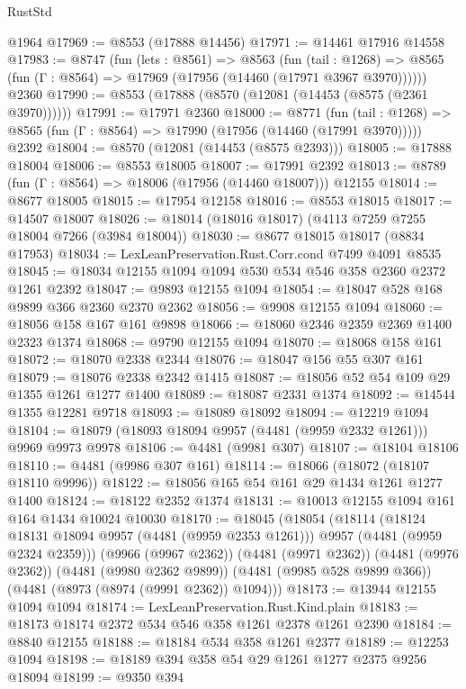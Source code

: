 \begin{lexlean}{RustStd}
\begin{coremodule}
    @1964
@17969 := @8553 (@17888 @14456)
@17971 := @14461 @17916 @14558
@17983 := @8747
    (fun (lets : @8561) =>
    @8563
      (fun (tail : @1268) =>
      @8565 (fun (Γ : @8564) => @17969 (@17956 (@14460 (@17971 @3967 @3970))))))
    @2360
@17990 := @8553 (@17888 (@8570 (@12081 (@14453 (@8575 (@2361 @3970))))))
@17991 := @17971 @2360
@18000 := @8771
    (fun (tail : @1268) => @8565 (fun (Γ : @8564) => @17990 (@17956 (@14460 (@17991 @3970)))))
    @2392
@18004 := @8570 (@12081 (@14453 (@8575 @2393)))
@18005 := @17888 @18004
@18006 := @8553 @18005
@18007 := @17991 @2392
@18013 := @8789 (fun (Γ : @8564) => @18006 (@17956 (@14460 @18007))) @12155
@18014 := @8677 @18005
@18015 := @17954 @12158
@18016 := @8553 @18015
@18017 := @14507 @18007
@18026 := @18014 (@18016 @18017) (@4113 @7259 @7255 @18004 @7266 (@3984 @18004))
@18030 := @8677 @18015 @18017 (@8834 @17953)
@18034 := LexLeanPreservation.Rust.Corr.cond @7499 @4091 @8535
@18045 := @18034 @12155 @1094 @1094 @530 @534 @546 @358 @2360 @2372 @1261 @2392
@18047 := @9893 @12155 @1094
@18054 := @18047 @528 @168 @9899 @366 @2360 @2370 @2362
@18056 := @9908 @12155 @1094
@18060 := @18056 @158 @167 @161 @9898
@18066 := @18060 @2346 @2359 @2369 @1400 @2323 @1374
@18068 := @9790 @12155 @1094
@18070 := @18068 @158 @161
@18072 := @18070 @2338 @2344
@18076 := @18047 @156 @55 @307 @161
@18079 := @18076 @2338 @2342 @1415
@18087 := @18056 @52 @54 @109 @29 @1355 @1261 @1277 @1400
@18089 := @18087 @2331 @1374
@18092 := @14544 @1355 @12281 @9718
@18093 := @18089 @18092
@18094 := @12219 @1094
@18104 := @18079 (@18093 @18094 @9957 (@4481 (@9959 @2332 @1261))) @9969 @9973 @9978
@18106 := @4481 (@9981 @307)
@18107 := @18104 @18106
@18110 := @4481 (@9986 @307 @161)
@18114 := @18066 (@18072 (@18107 @18110 @9996))
@18122 := @18056 @165 @54 @161 @29 @1434 @1261 @1277 @1400
@18124 := @18122 @2352 @1374
@18131 := @10013 @12155 @1094 @161 @164 @1434 @10024 @10030
@18170 := @18045
    (@18054
      (@18114
        (@18124 @18131 @18094 @9957 (@4481 (@9959 @2353 @1261)))
        @9957
        (@4481 (@9959 @2324 @2359)))
      (@9966 (@9967 @2362))
      (@4481 (@9971 @2362))
      (@4481 (@9976 @2362))
      (@4481 (@9980 @2362 @9899))
      (@4481 (@9985 @528 @9899 @366))
      (@4481 (@8973 (@8974 (@9991 @2362)) @1094)))
@18173 := @13944 @12155 @1094 @1094
@18174 := LexLeanPreservation.Rust.Kind.plain
@18183 := @18173 @18174 @2372 @534 @546 @358 @1261 @2378 @1261 @2390
@18184 := @8840 @12155
@18188 := @18184 @534 @358 @1261 @2377
@18189 := @12253 @1094
@18198 := @18189 @394 @358 @54 @29 @1261 @1277 @2375 @9256 @18094
@18199 := @9350 @394

\end{coremodule}
\end{lexlean}
